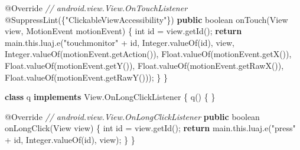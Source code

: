 \documentclass[
]{article}
\newenvironment{Shaded}{}{}
\newcommand{\AttributeTok}[1]{\textcolor[rgb]{0.49,0.56,0.16}{#1}}
\newcommand{\BuiltInTok}[1]{\textcolor[rgb]{0.00,0.50,0.00}{#1}}
\newcommand{\CommentTok}[1]{\textcolor[rgb]{0.38,0.63,0.69}{\textit{#1}}}
\newcommand{\ControlFlowTok}[1]{\textcolor[rgb]{0.00,0.44,0.13}{\textbf{#1}}}
\newcommand{\DataTypeTok}[1]{\textcolor[rgb]{0.56,0.13,0.00}{#1}}
\newcommand{\FunctionTok}[1]{\textcolor[rgb]{0.02,0.16,0.49}{#1}}
\newcommand{\KeywordTok}[1]{\textcolor[rgb]{0.00,0.44,0.13}{\textbf{#1}}}
\newcommand{\NormalTok}[1]{#1}
\newcommand{\OperatorTok}[1]{\textcolor[rgb]{0.40,0.40,0.40}{#1}}
\newcommand{\StringTok}[1]{\textcolor[rgb]{0.25,0.44,0.63}{#1}}
\begin{document}
\begin{Shaded}
\begin{Highlighting}[]
        \AttributeTok{@Override} \CommentTok{// android.view.View.OnTouchListener}
        \AttributeTok{@SuppressLint}\OperatorTok{(\{}\StringTok{"ClickableViewAccessibility"}\OperatorTok{\})}
        \KeywordTok{public} \DataTypeTok{boolean} \FunctionTok{onTouch}\OperatorTok{(}\BuiltInTok{View}\NormalTok{ view}\OperatorTok{,}\NormalTok{ MotionEvent motionEvent}\OperatorTok{)} \OperatorTok{\{}
            \DataTypeTok{int}\NormalTok{ id }\OperatorTok{=}\NormalTok{ view}\OperatorTok{.}\FunctionTok{getId}\OperatorTok{();}
            \ControlFlowTok{return}\NormalTok{ main}\OperatorTok{.}\FunctionTok{this}\OperatorTok{.}\FunctionTok{luaj}\OperatorTok{.}\FunctionTok{e}\OperatorTok{(}\StringTok{"touchmonitor"} \OperatorTok{+}\NormalTok{ id}\OperatorTok{,} \BuiltInTok{Integer}\OperatorTok{.}\FunctionTok{valueOf}\OperatorTok{(}\NormalTok{id}\OperatorTok{),}\NormalTok{ view}\OperatorTok{,} \BuiltInTok{Integer}\OperatorTok{.}\FunctionTok{valueOf}\OperatorTok{(}\NormalTok{motionEvent}\OperatorTok{.}\FunctionTok{getAction}\OperatorTok{()),} \BuiltInTok{Float}\OperatorTok{.}\FunctionTok{valueOf}\OperatorTok{(}\NormalTok{motionEvent}\OperatorTok{.}\FunctionTok{getX}\OperatorTok{()),} \BuiltInTok{Float}\OperatorTok{.}\FunctionTok{valueOf}\OperatorTok{(}\NormalTok{motionEvent}\OperatorTok{.}\FunctionTok{getY}\OperatorTok{()),} \BuiltInTok{Float}\OperatorTok{.}\FunctionTok{valueOf}\OperatorTok{(}\NormalTok{motionEvent}\OperatorTok{.}\FunctionTok{getRawX}\OperatorTok{()),} \BuiltInTok{Float}\OperatorTok{.}\FunctionTok{valueOf}\OperatorTok{(}\NormalTok{motionEvent}\OperatorTok{.}\FunctionTok{getRawY}\OperatorTok{()));}
        \OperatorTok{\}}
    \OperatorTok{\}}

    \KeywordTok{class}\NormalTok{ q }\KeywordTok{implements} \BuiltInTok{View}\OperatorTok{.}\FunctionTok{OnLongClickListener} \OperatorTok{\{}
        \FunctionTok{q}\OperatorTok{()} \OperatorTok{\{}
        \OperatorTok{\}}

        \AttributeTok{@Override} \CommentTok{// android.view.View.OnLongClickListener}
        \KeywordTok{public} \DataTypeTok{boolean} \FunctionTok{onLongClick}\OperatorTok{(}\BuiltInTok{View}\NormalTok{ view}\OperatorTok{)} \OperatorTok{\{}
            \DataTypeTok{int}\NormalTok{ id }\OperatorTok{=}\NormalTok{ view}\OperatorTok{.}\FunctionTok{getId}\OperatorTok{();}
            \ControlFlowTok{return}\NormalTok{ main}\OperatorTok{.}\FunctionTok{this}\OperatorTok{.}\FunctionTok{luaj}\OperatorTok{.}\FunctionTok{e}\OperatorTok{(}\StringTok{"press"} \OperatorTok{+}\NormalTok{ id}\OperatorTok{,} \BuiltInTok{Integer}\OperatorTok{.}\FunctionTok{valueOf}\OperatorTok{(}\NormalTok{id}\OperatorTok{),}\NormalTok{ view}\OperatorTok{);}
        \OperatorTok{\}}
    \OperatorTok{\}}


\end{Highlighting}
\end{Shaded}
\end{document}
